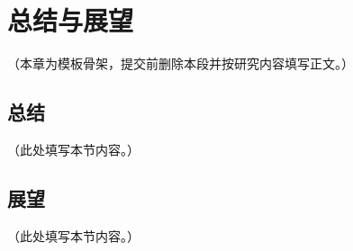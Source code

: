 
\chapter{总结与展望}

（本章为模板骨架，提交前删除本段并按研究内容填写正文。）

\section{总结}

（此处填写本节内容。）

\section{展望}

（此处填写本节内容。）
